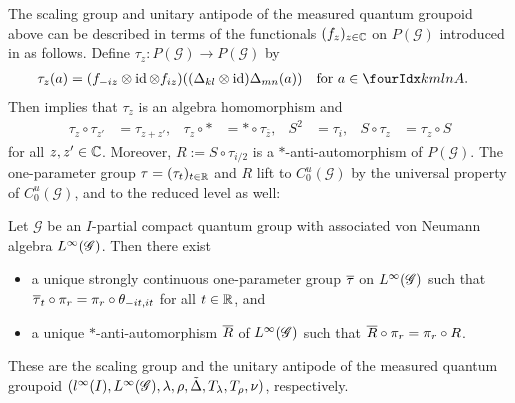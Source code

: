 The scaling group and unitary antipode of the measured quantum
groupoid above can be described in terms of the functionals
$(f_{z})_{z\in \mathbb{C}}$ on $P(\mathscr{G})$ introduced in \cite[Theorem
3.49]{DCT1} as follows.  Define $\tau_{z} \colon P(\mathscr{G}) \to
P(\mathscr{G})$ by
\begin{align*}
\tau_{z}(a) &= (f_{-iz} \otimes \id \otimes f_{iz})((\Delta_{kl}
\otimes \id)\Delta_{mn}(a)) \quad \text{for } a\in \Gr{A}{k}{l}{m}{n}.
\end{align*}
Then \cite[Theorem 3.49]{DCT1} implies that $\tau_{z}$ is an algebra
homomorphism and
\begin{align} \label{eq:alg-scale}
  \tau_{z} \circ \tau_{z'} &= \tau_{z+z'}, &
  \tau_{z}\circ \ast &=  \ast\circ \tau_{\overline{z}}, &
  S^{2} &= \tau_{i}, & S \circ \tau_{z} &= \tau_{z} \circ S
\end{align}
for all $z,z'\in \mathbb{C}$. Moreover, $R:=S\circ
\tau_{i/2}$ is a $*$-anti-automorphism of $P(\mathscr{G})$.  The
one-parameter group $\tau=(\tau_{t})_{t\in \mathbb{R}}$ and $R$ lift to
$C^{u}_{0}(\mathscr{G})$ by the universal property of
$C^{u}_{0}(\mathscr{G})$, and to the reduced level as well:
\begin{Prop}
  Let $\mathscr{G}$ be an $I$-partial compact quantum group with
  associated von Neumann algebra $L^{\infty}(\mathscr{G})$. Then there exist
  \begin{itemize}
  \item a unique strongly continuous one-parameter group $\overline{\tau}$ on
    $L^{\infty}(\mathscr{G})$ such that $\overline{\tau}_{t} \circ \pi_{r} = \pi_{r} \circ
    \theta_{-it,it}$ for all $t\in \mathbb{R}$, and
  \item a unique $*$-anti-automorphism $\overline{R}$ of $L^{\infty}(\mathscr{G})$ such that
    $\overline{R} \circ \pi_{r} = \pi_{r} \circ R$.
  \end{itemize}
These
  are the scaling group and the unitary antipode of the measured
  quantum groupoid    $(l^{\infty}(I),L^{\infty}(\mathscr{G}), \lambda,\rho,\tilde\Delta,
  T_{\lambda},T_{\rho},\nu)$, respectively.
\end{Prop}
